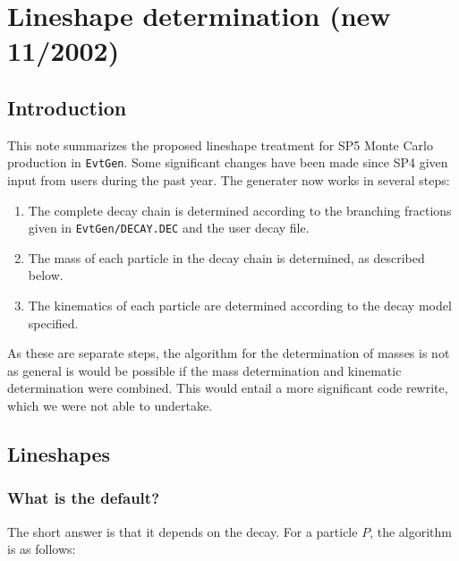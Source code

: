 \section{Lineshape determination (new 11/2002)}

\subsection{Introduction}

This note summarizes the proposed lineshape treatment
for SP5 Monte Carlo production in {\tt EvtGen}.  Some 
significant changes have been made since SP4 given 
input from users during the past year.  The generater
now works in several steps:
\begin{enumerate}
\item The complete decay chain is determined according
to the branching fractions given in {\tt EvtGen/DECAY.DEC}
and the user decay file.
\item The mass of each particle in the decay chain 
is determined, as described below.
\item The kinematics of each particle are determined 
according to the decay model specified.
\end{enumerate}

As these are separate steps, the algorithm for
the determination of masses is not as general
is would be possible if the mass determination and
kinematic determination were combined.  This would
entail a more significant code rewrite, which we
were not able to undertake.  

\subsection{Lineshapes}

\subsubsection{What is the default?}

The short answer is that it depends on the decay.  For a
particle $P$, the algorithm is as follows:

